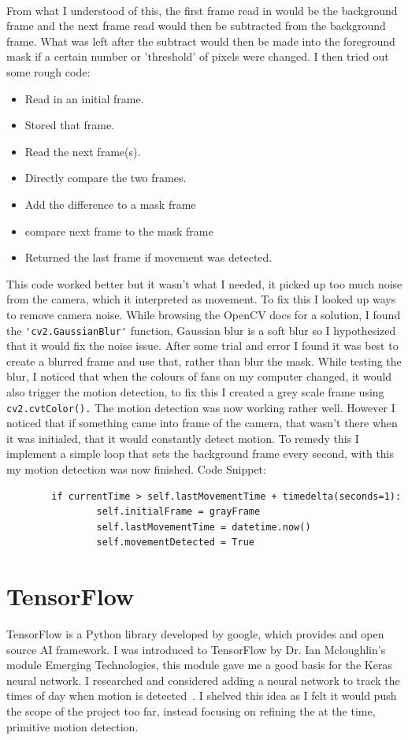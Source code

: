 \\ From what I understood of this, the first frame read in would be the background frame and the next frame read would then be subtracted from the background frame. What was left after the subtract would then be made into the foreground mask if a certain number or 'threshold' of pixels were changed. I then tried out some rough code:
 \begin{itemize}
 \item Read in an initial frame.
 \item Stored that frame.
 \item Read the next frame(s).
 \item Directly compare the two frames.
 \item Add the difference to a mask frame 
 \item compare next frame to the mask frame
 \item Returned the last frame if movement was detected.
 \end{itemize}
 This code worked better but it wasn't what I needed, it picked up too much noise from the camera, which it interpreted as movement. To fix this I looked up ways to remove camera noise. While browsing the OpenCV docs for a solution, I found the \verb|'cv2.GaussianBlur'| function, Gaussian blur is a soft blur so I hypothesized that it would fix the noise issue. After some trial and error I found it was best to create a blurred frame and use that, rather than blur the mask. While testing the blur, I noticed that when the colours of fans on my computer changed, it would also trigger the motion detection, to fix this I created a grey scale frame using \verb|cv2.cvtColor().| The motion detection was now working rather well. However I noticed that if something came into frame of the camera, that wasn't there when it was initialed, that it would constantly detect motion. To remedy this I implement a simple loop that sets the background frame every second, with this my motion detection was now finished.    Code Snippet:\begin{verbatim}
        if currentTime > self.lastMovementTime + timedelta(seconds=1):  
            	self.initialFrame = grayFrame 
            	self.lastMovementTime = datetime.now() 
            	self.movementDetected = True 
 \end{verbatim}
 
\section{TensorFlow}
TensorFlow is a Python library developed by google, which provides and open source AI framework. I was introduced to TensorFlow by Dr. Ian Mcloughlin's module Emerging Technologies, this module gave me a good basis for the Keras neural network. I researched and considered adding a neural network to track the times of day when motion is detected~\cite{kerasTrain}. I shelved this idea as I felt it would push the scope of the project too far, instead focusing on refining the at the time, primitive motion detection.

